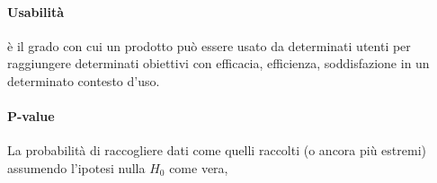 \documentclass[11pt,a4paper]{book}
\begin{document}
\paragraph{Usabilità}
è il grado con cui un prodotto può essere usato da determinati utenti per raggiungere determinati obiettivi con efficacia, efficienza, soddisfazione in un determinato contesto d'uso.

\paragraph{P-value}
La probabilità di raccogliere dati come quelli raccolti (o ancora più estremi) assumendo l'ipotesi nulla $H_0$ come vera,
\end{document}
